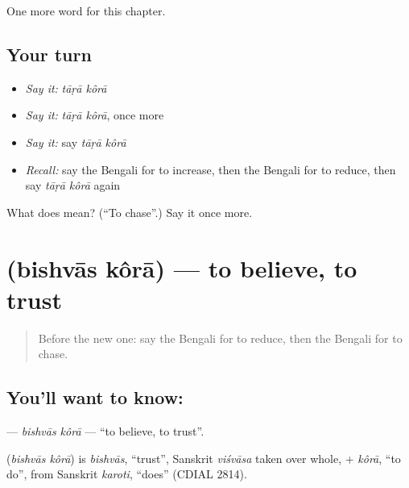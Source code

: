\begin{grammarlens}[title={What you've built}]
One more word for this chapter.
\end{grammarlens}

\subsection*{Your turn}
\begin{itemize}
\raggedright
  \item \emph{Say it:} \emph{tāṛā kôrā}
  \item \emph{Say it:} \emph{tāṛā kôrā}, once more
  \item \emph{Say it:} say \emph{tāṛā kôrā}
  \item \emph{Recall:} say the Bengali for to increase, then the Bengali for to reduce, then say \emph{tāṛā kôrā} again
\end{itemize}

\begin{tcolorbox}[breakable,colback=teal!4,colframe=teal!35!black,title={Before you move on}]
What does   mean? (\textquotedblleft{}To chase\textquotedblright{}.) Say it once more.
\end{tcolorbox}
\section[\texorpdfstring{\bn{বিশ্বাস} \bn{করা} (bishvās kôrā)}{বিশ্বাস করা (bishvās kôrā)}]{  (bishvās kôrā) — to believe, to trust}

\label{lesson:BN-C238-bishvas-kora}



\begin{quote}
Before the new one: say the Bengali for to reduce, then the Bengali for to chase.
\end{quote}

\subsection*{You'll want to know:  }
\textbf{ } — \emph{bishvās kôrā} — \textquotedblleft{}to believe, to trust\textquotedblright{}.

\begin{cousinweb}
\textbf{ } (\emph{bishvās kôrā}) is \emph{bishvās}, \textquotedblleft{}trust\textquotedblright{}, Sanskrit \emph{viśvāsa} taken over whole, + \emph{kôrā}, \textquotedblleft{}to do\textquotedblright{}, from Sanskrit \emph{karoti}, \textquotedblleft{}does\textquotedblright{} (CDIAL 2814).
\end{cousinweb}

